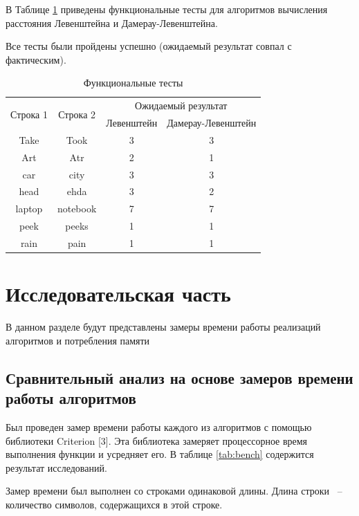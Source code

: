\documentclass[12pt]{report}
\begin{document}
\clearpage

В Таблице \ref{tab:func_tests} приведены функциональные тесты для алгоритмов вычисления расстояния Левенштейна и Дамерау-Левенштейна.

Все тесты были пройдены успешно (ожидаемый результат совпал с фактическим).

\begin{table}[h]
	\centering
	\begin{tabular}{|c|c|c|c|}
		\hline
		\multirow{2}{*}{Строка 1} & \multirow{2}{*}{Строка 2} & \multicolumn{2}{c|}{Ожидаемый результат} \\ \cline{3-4} 
		&          & Левенштейн & Дамерау-Левенштейн \\ \hline
		Take   & Took     & 3          & 3                   \\ \hline
		Art    & Atr      & 2          & 1                   \\ \hline
		car    & city     & 3          & 3                   \\ \hline
		head   & ehda     & 3          & 2                   \\ \hline
		laptop & notebook & 7          & 7                   \\ \hline
		peek   & peeks    & 1          & 1                   \\ \hline
		rain   & pain     & 1          & 1                   \\ \hline
	\end{tabular}
	\caption{Функциональные тесты}
	\label{tab:func_tests}
\end{table}
	
	\chapter{Исследовательская часть}
	В данном разделе будут представлены замеры времени работы реализаций алгоритмов и потребления памяти
	
	\section{Сравнительный анализ на основе замеров времени работы алгоритмов}
	
	Был проведен замер времени работы каждого из алгоритмов с помощью библиотеки Criterion [3]. Эта библиотека замеряет процессорное время выполнения функции и усредняет его. В таблице \ref{tab:bench} содержится результат исследований.

	Замер времени был выполнен со строками одинаковой длины. Длина строки ~--~ количество символов, содержащихся в этой строке.
	
\end{document}
